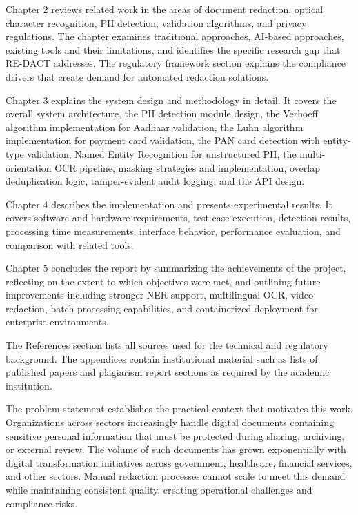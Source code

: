 Chapter 2 reviews related work in the areas of document redaction, optical character recognition, PII detection, validation algorithms, and privacy regulations. The chapter examines traditional approaches, AI-based approaches, existing tools and their limitations, and identifies the specific research gap that RE-DACT addresses. The regulatory framework section explains the compliance drivers that create demand for automated redaction solutions.

Chapter 3 explains the system design and methodology in detail. It covers the overall system architecture, the PII detection module design, the Verhoeff algorithm implementation for Aadhaar validation, the Luhn algorithm implementation for payment card validation, the PAN card detection with entity-type validation, Named Entity Recognition for unstructured PII, the multi-orientation OCR pipeline, masking strategies and implementation, overlap deduplication logic, tamper-evident audit logging, and the API design.

Chapter 4 describes the implementation and presents experimental results. It covers software and hardware requirements, test case execution, detection results, processing time measurements, interface behavior, performance evaluation, and comparison with related tools.

Chapter 5 concludes the report by summarizing the achievements of the project, reflecting on the extent to which objectives were met, and outlining future improvements including stronger NER support, multilingual OCR, video redaction, batch processing capabilities, and containerized deployment for enterprise environments.

The References section lists all sources used for the technical and regulatory background. The appendices contain institutional material such as lists of published papers and plagiarism report sections as required by the academic institution.

\bigskip

\bigskip

The problem statement establishes the practical context that motivates this work. Organizations across sectors increasingly handle digital documents containing sensitive personal information that must be protected during sharing, archiving, or external review. The volume of such documents has grown exponentially with digital transformation initiatives across government, healthcare, financial services, and other sectors. Manual redaction processes cannot scale to meet this demand while maintaining consistent quality, creating operational challenges and compliance risks.

